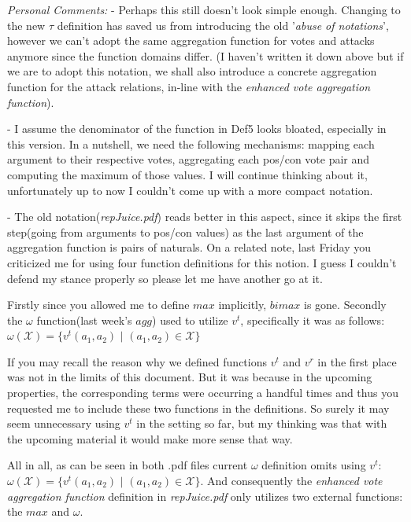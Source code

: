 \documentclass{article}
\begin{document}
{\color{teal}
 
\emph{Personal Comments:} 
-  Perhaps this still doesn't look simple enough. Changing to the new $\tau$ definition has saved us from introducing the old '\emph{abuse of notations}', however we can't adopt the same aggregation function for votes and attacks anymore since the function domains differ. (I haven't written it down above but if we are to adopt this notation, we shall also introduce a concrete aggregation function for the attack relations, in-line with the \emph{enhanced vote aggregation function}).
\vspace{5 mm}

- I assume the denominator of the function in Def5 looks bloated, especially in this version. In a nutshell, we need the following mechanisms: mapping each argument to their respective votes, aggregating each pos/con vote pair  and computing the maximum of those values.  I will continue thinking about it, unfortunately up to now I couldn't come up with a more compact notation.
\vspace{5 mm}

- The old notation(\emph{repJuice.pdf}) reads better in this aspect, since it skips the first step(going from arguments to pos/con values) as the last argument of the aggregation function is pairs of naturals. On a related note, last Friday you criticized me for using four function definitions for this notion. I guess I couldn't defend my stance properly so please let me have another go at it. 

Firstly since you allowed me to define $max$ implicitly, $bimax$ is gone. Secondly the $\omega$ function(last week's $agg$) used to utilize $v^{t}$, specifically it was as follows: $\omega(\mathcal{X}) = \{v^t(a_1, a_2)$ $|$ $(a_1, a_2) \in \mathcal{X}\}$

If you may recall the reason why we defined functions $v^t$ and $v^r$ in the first place was not in the limits of this document. But it was because in the upcoming properties, the corresponding terms were occurring a handful times and thus you requested me to include these two functions in the definitions. So surely it may seem unnecessary using $v^t$ in the setting so far, but my thinking was that with the upcoming material it would make more sense that way.

All in all, as can be seen in both .pdf files current $\omega$ definition omits using $v^t$: $\omega(\mathcal{X}) = \{v^t(a_1, a_2)$ $|$ $(a_1, a_2) \in \mathcal{X}\}$. And consequently the \emph{enhanced vote aggregation function} definition in \emph{repJuice.pdf} only utilizes two external functions: the $max$ and $\omega$.

}
\end{document}
